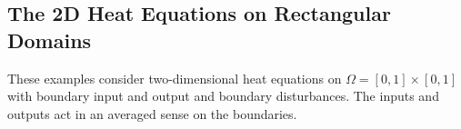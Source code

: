 \documentclass[11pt, a4paper]{amsart}
\theoremstyle{definition}
\numberwithin{equation}{section}
\newcommand{\wdist}{w_{\mbox{\scriptsize\textit{dist}}}}
\begin{document}

\subsection{The 2D Heat Equations on Rectangular Domains}

These examples consider two-dimensional heat equations on $\Omega = [0,1]\times [0,1]$ with boundary input and output and boundary disturbances. The inputs and outputs act in an averaged sense on the boundaries.
\end{document}
